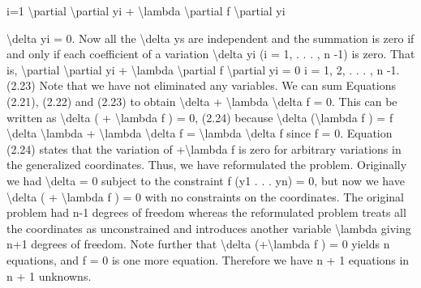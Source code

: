 i=1
\textbackslash{}partial
\textbackslash{}partial yi
+ \textbackslash{}lambda  \textbackslash{}partial f
\textbackslash{}partial yi

\textbackslash{}delta yi = 0.
Now all the \textbackslash{}delta ys are independent and the summation is zero if and only if each
coefficient of a variation \textbackslash{}delta yi (i = 1, . . . , n -1) is zero. That is,
\textbackslash{}partial
\textbackslash{}partial yi
+ \textbackslash{}lambda  \textbackslash{}partial f
\textbackslash{}partial yi
= 0
i = 1, 2, . . . , n -1.
(2.23)
Note that we have not eliminated any variables. We can sum Equations (2.21),
(2.22) and (2.23) to obtain
\textbackslash{}delta  + \textbackslash{}lambda \textbackslash{}delta f = 0.
This can be written as
\textbackslash{}delta ( + \textbackslash{}lambda f ) = 0,
(2.24)
because \textbackslash{}delta (\textbackslash{}lambda f ) = f \textbackslash{}delta \textbackslash{}lambda  + \textbackslash{}lambda \textbackslash{}delta f = \textbackslash{}lambda \textbackslash{}delta f since f = 0.
Equation (2.24) states that the variation of +\textbackslash{}lambda f is zero for arbitrary variations in the generalized coordinates. Thus, we have reformulated the problem.
Originally we had \textbackslash{}delta  = 0 subject to the constraint f (y1 . . . yn) = 0, but now
we have \textbackslash{}delta ( + \textbackslash{}lambda f ) = 0 with no constraints on the coordinates. The original
problem had n-1 degrees of freedom whereas the reformulated problem treats
all the coordinates as unconstrained and introduces another variable \textbackslash{}lambda  giving
n+1 degrees of freedom. Note further that \textbackslash{}delta (+\textbackslash{}lambda f ) = 0 yields n equations,
and f = 0 is one more equation. Therefore we have n + 1 equations in n + 1
unknowns.

